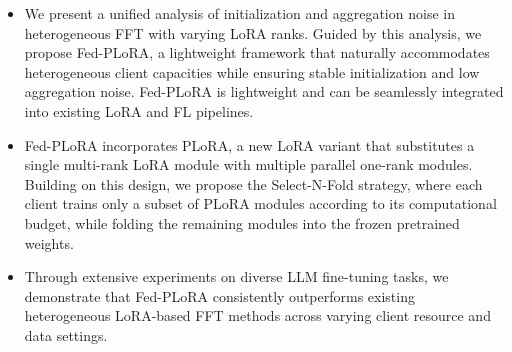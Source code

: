 \documentclass{article} %
\begin{document}
\begin{itemize}\vspace{-5pt}
    \item We present a unified analysis of initialization and aggregation noise in heterogeneous FFT with varying LoRA ranks. Guided by this analysis, we propose Fed-PLoRA, a lightweight framework that naturally accommodates heterogeneous client capacities while ensuring stable initialization and low aggregation noise. Fed-PLoRA is lightweight and can be seamlessly integrated into existing LoRA and FL pipelines.
    
    \item Fed-PLoRA incorporates PLoRA, a new LoRA variant that substitutes a single multi-rank LoRA module with multiple parallel one-rank modules. Building on this design, we propose the Select-N-Fold strategy, where each client trains only a subset of PLoRA modules according to its computational budget, while folding the remaining modules into the frozen pretrained weights. 
    
    
    \item Through extensive experiments on diverse LLM fine-tuning tasks, we demonstrate that Fed-PLoRA consistently outperforms existing heterogeneous LoRA-based FFT methods across varying client resource and data settings. 
\end{itemize}
\end{document}
